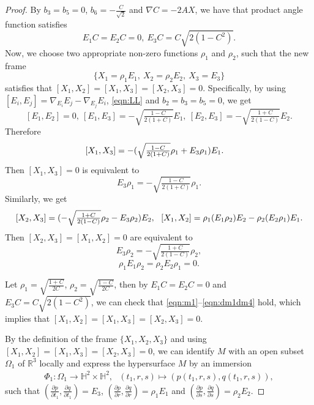 \documentclass[10pt,a4paper]{amsart}
\begin{document}
\begin{proof}
By $b_3=b_5=0$, $b_6=-\frac{C}{\sqrt{2}}$ and $\nabla C=-2AX$, we have that product angle function satisfies
$$
E_1C=E_2C=0,\ E_3C=C\sqrt{2(1-C^2)}.
$$
Now, we choose two appropriate non-zero functions $\rho_1$ and $\rho_2$, such that
the new frame
$$
\{X_1=\rho_1E_1,\ X_2=\rho_2E_2,\ X_3=E_3\}
$$
satisfies that $[X_1,X_2]=[X_1,X_3]=[X_2,X_3]=0$. Specifically, by using
$[E_i,E_j]=\nabla_{E_i} {E_j}-\nabla_{E_j} {E_i}$, \eqref{eqn:LL} and $b_2=b_3=b_5=0$, we get
$$
[E_1,E_2]=0,\ [E_1,E_3]=-\sqrt{\tfrac{1-C}{2(1+C)}}E_1,\ [E_2,E_3]=-\sqrt{\tfrac{1+C}{2(1-C)}}E_2.
$$
Therefore
$$
\begin{aligned}
{\text [X_1,X_3]}&=-(\sqrt{\tfrac{1-C}{2(1+C)}}\rho_1+E_3\rho_1)E_1.
\end{aligned}
$$
Then $[X_1,X_3]=0$ is equivalent to
%
\begin{equation}\label{eqn:m1}
E_3\rho_1=-\sqrt{\tfrac{1-C}{2(1+C)}}\rho_1.
\end{equation}
Similarly, we get
$$
{\text [X_2,X_3]}=(-\sqrt{\tfrac{1+C}{2(1-C)}}\rho_2-E_3\rho_2)E_2,\ \
{\text [X_1,X_2]}=\rho_1(E_1\rho_2)E_2-\rho_2(E_2\rho_1)E_1.
$$
Then $[X_2,X_3]=[X_1,X_2]=0$ are equivalent to
%
\begin{equation}\label{eqn:m2}
E_3\rho_2=-\sqrt{\tfrac{1+C}{2(1-C)}}\rho_2,
\end{equation}
%
\begin{equation}\label{eqn:dm1dm4}
\rho_1 E_1\rho_2=\rho_2E_2\rho_1=0.
\end{equation}

Let $\rho_1=\sqrt{\frac{1+C}{2C}}$, $\rho_2=\sqrt{\frac{1-C}{2C}}$, then by $E_1C=E_2C=0$ and $E_3C=C\sqrt{2(1-C^2)}$,
we can check that \eqref{eqn:m1}--\eqref{eqn:dm1dm4} hold, which implies that $[X_1,X_2]=[X_1,X_3]=[X_2,X_3]=0$.

By the definition of the frame $\{X_1,X_2,X_3\}$ and using $[X_1,X_2]=[X_1,X_3]=[X_2,X_3]=0$,
we can identify $M$ with an open subset $\Omega_1$ of $\mathbb{R}^3$ locally and express the hypersurface $M$ by an immersion
$$
\begin{aligned}
\Phi_1:\Omega_1
\longrightarrow\mathbb{H}^2\times\mathbb{H}^2,\ \ \
(t_1,r,s)\mapsto (p(t_1,r,s),q(t_1,r,s)),
\end{aligned}
$$
such that $(\frac{\partial p}{\partial t_1},\frac{\partial q}{\partial t_1})=E_3$,
$(\frac{\partial p}{\partial r},\frac{\partial q}{\partial r})=\rho_1E_1$ and
$(\frac{\partial p}{\partial s},\frac{\partial q}{\partial s})=\rho_2E_2$.



\end{proof}
\end{document}

